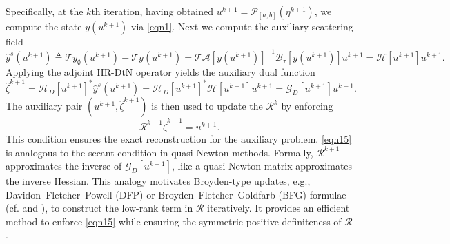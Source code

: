 \documentclass[onefignum,onetabnum]{siamart190516}
\numberwithin{equation}{section}
\begin{document}
Specifically, at the $k$th iteration, having obtained $u^{k+1}=\mathcal{P}_{[a,b]}(\eta^{k+1})$, we compute the state $y(u^{k+1})$ via \eqref{eqn1}.
Next we compute the auxiliary scattering field
\begin{equation*}
\hat{y}^{s}(u^{k+1}) \triangleq \mathcal{T}y_{\emptyset}(u^{k+1}) - \mathcal{T}y(u^{k+1}) = \mathcal{T}\mathcal{A}[y(u^{k+1})]^{-1}\mathcal{B}_{\tau}[y(u^{k+1})]u^{k+1} = \mathcal{H}[u^{k+1}]u^{k+1}.
\end{equation*}
Applying the adjoint HR-DtN operator yields the auxiliary dual function
\begin{equation*}
\hat{\zeta}^{k+1} = \mathcal{H}_{D}[u^{k+1}]^{*}\hat{y}^{s}(u^{k+1}) = \mathcal{H}_{D}[u^{k+1}]^{*}\mathcal{H}[u^{k+1}]u^{k+1} = \mathcal{G}_{D}[u^{k+1}]u^{k+1}.
\end{equation*}
The auxiliary pair $(u^{k+1}, \hat{\zeta}^{k+1})$ is then used to update the $\mathcal{R}^{k}$ by enforcing 
\begin{equation}\label{eqn15}
\mathcal{R}^{k+1}\hat{\zeta}^{k+1} = u^{k+1}.
\end{equation}
This condition ensures the exact reconstruction for the auxiliary problem.
\eqref{eqn15} is analogous to the secant condition in quasi-Newton methods.
Formally, $\mathcal{R}^{k+1}$ approximates the inverse of $\mathcal{G}_D[u^{k+1}]$, like a quasi-Newton matrix approximates the inverse Hessian.
This analogy motivates Broyden-type updates, e.g., Davidon–Fletcher–Powell (DFP) or Broyden–Fletcher–Goldfarb (BFG) formulae (cf. \cite[pp. 149]{Wright2006} and \cite[pp. 169]{Schnabel1996}), to construct the low-rank term in $\mathcal{R}$ iteratively.
It provides an efficient method to enforce \eqref{eqn15} while ensuring the symmetric positive definiteness of $\mathcal{R}$.
\end{document}
